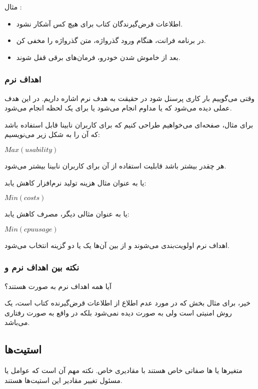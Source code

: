 مثال :

\begin{itemize}
    \item اطلاعات قرض‌گیرندگان کتاب برای هیچ کس آشکار نشود.
    \item در برنامه فرانت، هنگام ورود گذرواژه، متن گذرواژه را مخفی کن.
    \item بعد از خاموش شدن خودرو، فرمان‌های برقی قفل شوند.
\end{itemize}

\subsubsection{اهداف نرم}

وقتی می‌گوییم بار کاری پرسنل  شود در حقیقت به هدف نرم اشاره داریم.
در این هدف عملی دیده می‌شود که یا مداوم انجام می‌شود یا برای یک لحظه انجام
می‌شود.

برای مثال، صفحه‌ای می‌خواهیم طراحی کنیم که برای کاربران نابینا قابل استفاده باشد
که آن را به شکل زیر می‌نویسیم:

$Max(usability)$

هر چقدر بیشتر باشد قابلیت استفاده از آن برای کاربران نابینا بیشتر می‌شود.

یا به عنوان مثال هزینه تولید نرم‌افزار کاهش یابد:

$Min(costs)$

یا به عنوان مثالی دیگر، مصرف  کاهش یابد:

$Min(cpu usage)$

اهداف نرم اولویت‌بندی می‌شوند و از بین آن‌ها یک یا دو گزینه انتخاب می‌شود.

\subsubsection{نکته بین اهداف نرم و }

آیا همه اهداف نرم به صورت  هستند؟

خیر، برای مثال بخش  که در مورد عدم اطلاع از اطلاعات قرض‌گیرنده کتاب
است، یک روش امنیتی است ولی به صورت  دیده نمی‌شود بلکه در واقع به صورت
رفتاری می‌باشد.

\subsection{استیت‌ها}

متغیر‌ها یا ها صفاتی خاص هستند با مقادیری خاص. نکته مهم آن است که
عوامل یا  مسئول تغییر مقادیر این استیت‌ها هستند.

